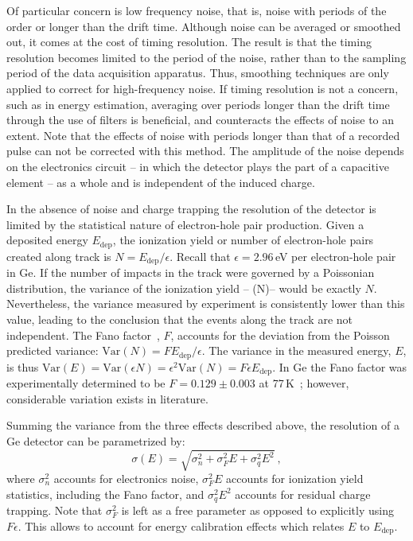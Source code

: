 Of particular concern is low frequency noise, that is, noise with periods of the order or longer than the drift time. Although noise can be averaged or smoothed out, it comes at the cost of timing resolution. The result is that the timing resolution becomes limited to the period of the noise, rather than to the sampling period of the data acquisition apparatus. Thus, smoothing techniques are only applied to correct for high-frequency noise. If timing resolution is not a concern, such as in energy estimation, averaging over periods longer than the drift time through the use of filters is beneficial, and counteracts the effects of noise to an extent. Note that the effects of noise with periods longer than that of a recorded pulse can not be corrected with this method. The amplitude of the noise depends on the electronics circuit -- in which the detector plays the part of a capacitive element -- as a whole and is independent of the induced charge.

In the absence of noise and charge trapping the resolution of the detector is limited by the statistical nature of electron-hole pair production. Given a deposited energy $E_\text{dep}$, the ionization yield or number of electron-hole pairs created along track is $N = E_\text{dep}/\epsilon$. Recall that $\epsilon = 2.96$\,eV per electron-hole pair in Ge. If the number of impacts in the track were governed by a Poissonian distribution, the variance of the ionization yield -- (N)-- would be exactly $N$. Nevertheless, the variance measured by experiment is consistently lower than this value, leading to the conclusion that the events along the track are not independent. The Fano factor~\cite{fano}, $F$, accounts for the deviation from the Poisson predicted variance: $\text{Var}(N) = FE_\text{dep}/\epsilon$. The variance in the measured energy, $E$, is thus $\text{Var}(E) = \text{Var}(\epsilon N) = \epsilon^2\text{Var}(N) = F\epsilon E_\text{dep}$. In Ge the Fano factor was experimentally determined to be $F = 0.129 \pm 0.003$ at 77\,K~\cite{fanoGe}; however, considerable variation exists in literature. 

Summing the variance from the three effects described above, the resolution of a Ge detector can be parametrized by:
\begin{equation}
	\sigma(E) = \sqrt{\sigma_n^2 + \sigma_F^2E + \sigma_q^2E^2}~,
	\label{eq:energy_resolution}
\end{equation}
where $\sigma_n^2$ accounts for electronics noise, $\sigma_F^2E$ accounts for ionization yield statistics, including the Fano factor, and $\sigma_q^2E^2$ accounts for residual charge trapping. Note that $\sigma_F^2$ is left as a free parameter as opposed to explicitly using $F\epsilon$. This allows to account for energy calibration effects which relates $E$ to $E_\text{dep}$. 


